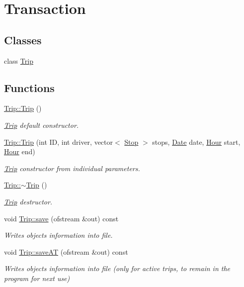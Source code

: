\hypertarget{group___trip}{}\section{Transaction}
\label{group___trip}
\subsection*{Classes}
\begin{DoxyCompactItemize}
\item 
class \hyperlink{class_trip}{Trip}
\end{DoxyCompactItemize}
\subsection*{Functions}
\begin{DoxyCompactItemize}
\item 
\mbox{\label{group___trip_gaa67b77d0d2de622ed5eb9e9cad34db8f}} 
\hyperlink{group___trip_gaa67b77d0d2de622ed5eb9e9cad34db8f}{Trip\+::\+Trip} ()
\begin{DoxyCompactList}\small\item\em \hyperlink{class_trip}{Trip} default constructor. \end{DoxyCompactList}\item 
\hyperlink{group___trip_gaadf8ba70a9d5aa210149b5162e402512}{Trip\+::\+Trip} (int ID, int driver, vector$<$ \hyperlink{class_stop}{Stop} $>$ stops, \hyperlink{class_date}{Date} date, \hyperlink{class_hour}{Hour} start, \hyperlink{class_hour}{Hour} end)
\begin{DoxyCompactList}\small\item\em \hyperlink{class_trip}{Trip} constructor from individual parameters. \end{DoxyCompactList}\item 
\mbox{\label{group___trip_ga2376daed3b03469163782ef0d0533d52}} 
\hyperlink{group___trip_ga2376daed3b03469163782ef0d0533d52}{Trip\+::$\sim$\+Trip} ()
\begin{DoxyCompactList}\small\item\em \hyperlink{class_trip}{Trip} destructor. \end{DoxyCompactList}\item 
void \hyperlink{group___trip_ga6ae6134652b644fa63bf267b956f1e75}{Trip\+::save} (ofstream \&out) const
\begin{DoxyCompactList}\small\item\em Writes object\textquotesingle{}s information into file. \end{DoxyCompactList}\item 
void \hyperlink{group___trip_gafcf569c0a9d6e5a47134f7e9dd62334a}{Trip\+::save\+AT} (ofstream \&out) const
\begin{DoxyCompactList}\small\item\em Writes object\textquotesingle{}s information into file (only for active trips, to remain in the program for next use) \end{DoxyCompactList}\end{DoxyCompactItemize}
